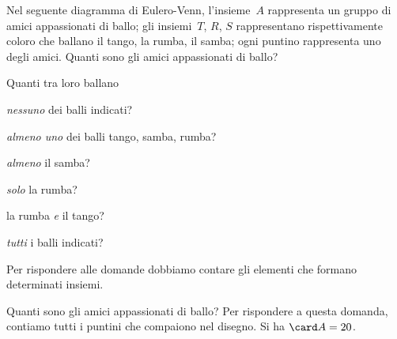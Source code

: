 {%
 \begin{esempio}
Nel seguente diagramma di Eulero-Venn, l'insieme~\(A\) rappresenta un 
gruppo di 
amici appassionati di ballo; gli insiemi~\(T\), \(R\),
\(S\) rappresentano rispettivamente coloro che ballano il tango, la rumba, 
il samba; ogni puntino rappresenta uno degli amici.
Quanti sono gli amici appassionati di ballo?

\begin{minipage}{.59 \textwidth}
Quanti tra loro ballano
\begin{enumeratea}
\item \emph{nessuno} dei balli indicati?
\item \emph{almeno uno} dei balli tango, samba, rumba?
\item \emph{almeno} il samba?
\item \emph{solo} la rumba?
\item la rumba \emph{e} il tango?
\item \emph{tutti} i balli indicati?
\end{enumeratea}
\end{minipage}
\hfill
\begin{minipage}{.39 \textwidth}
\begin{center}
 
\end{center}
\end{minipage}

Per rispondere alle domande dobbiamo contare gli elementi che formano 
determinati insiemi.

Quanti sono gli amici appassionati di ballo? Per rispondere a questa
domanda, contiamo tutti i puntini che compaiono nel disegno. Si ha 
\(\card A=20\).


\end{esempio}}
